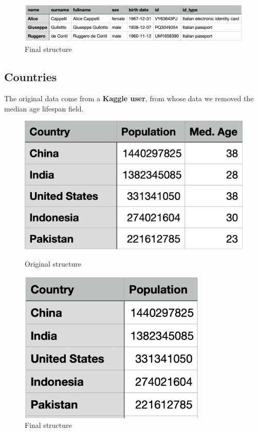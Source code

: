 \documentclass{article}[IEEEtran]
\begin{document}
\begin{figure}[H]
\begin{center}
\includegraphics[width=0.5\linewidth, frame]{people.png}
\caption{Final structure}
\end{center}
\end{figure}


\subsection{Countries}

The original data come from a \textbf{Kaggle user}\cite{worldcountries}, from whose data we removed the median age lifespan field. 

 \begin{figure}[H]
    \centering
    \begin{minipage}{0.30\textwidth}
        \centering
        \includegraphics[width=1.1\textwidth,frame]{countries_original.png}
        \caption{Original structure}
    \end{minipage}
    \hspace{1cm}
    \begin{minipage}{0.30\textwidth}
        \centering
        \includegraphics[width=0.8\textwidth, frame]{countries.png} 
        \caption{Final structure}
    \end{minipage}

\end{figure}
\end{document}
